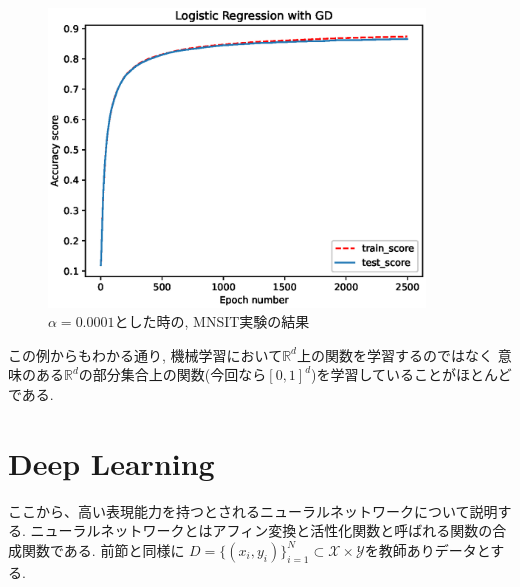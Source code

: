 \documentclass[11pt, a4paper, dvipdfmx]{jsarticle}
\theoremstyle{definition}
\newcommand{\R}{\mathbb{R}}
\newcommand{\X}{\mathcal{X}}
\newcommand{\Y}{\mathcal{Y}}
\begin{document}
\begin{figure}[H]
    \centering
    \includegraphics[width = 10.0cm]{Images/MNIST_Experiment.eps}
    \caption{$\alpha = 0.0001$とした時の, MNSIT実験の結果}
\end{figure}
この例からもわかる通り, 機械学習において$\R^d$上の関数を学習するのではなく
意味のある$\R^d$の部分集合上の関数(今回なら$[0, 1]^d$)を学習していることがほとんどである.
\section{Deep Learning}
ここから、高い表現能力を持つとされるニューラルネットワークについて説明する. 
ニューラルネットワークとはアフィン変換と活性化関数と呼ばれる関数の合成関数である. 前節と同様に
$D = \{(x_i, y_i)\}_{i = 1}^{N}\subset\X\times\Y$を教師ありデータとする.
\end{document}
